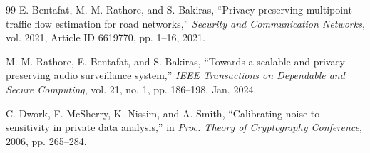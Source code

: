 \documentclass[conference]{IEEEtran}
\begin{document}
\begin{thebibliography}{99}
E. Bentafat, M. M. Rathore, and S. Bakiras, ``Privacy-preserving multipoint traffic flow estimation for road networks,'' \textit{Security and Communication Networks}, vol. 2021, Article ID 6619770, pp. 1--16, 2021.

M. M. Rathore, E. Bentafat, and S. Bakiras, ``Towards a scalable and privacy-preserving audio surveillance system,'' \textit{IEEE Transactions on Dependable and Secure Computing}, vol. 21, no. 1, pp. 186--198, Jan. 2024.

C. Dwork, F. McSherry, K. Nissim, and A. Smith, ``Calibrating noise to sensitivity in private data analysis,'' in \textit{Proc. Theory of Cryptography Conference}, 2006, pp. 265--284.
\end{thebibliography}
\end{document}
